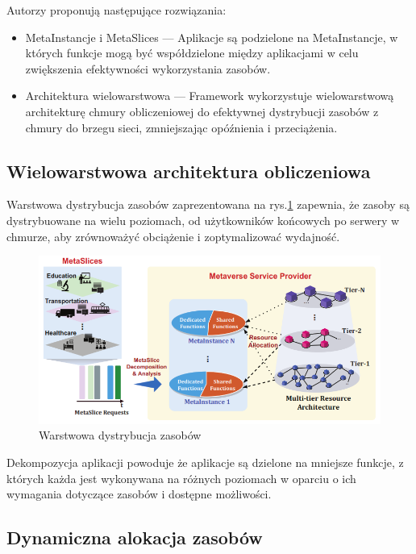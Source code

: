 Autorzy proponują następujące rozwiązania:
\begin{itemize}
    \item MetaInstancje i MetaSlices --- Aplikacje są podzielone na MetaInstancje, w których funkcje mogą być współdzielone między aplikacjami w celu zwiększenia efektywności wykorzystania zasobów.
    \item Architektura wielowarstwowa --- Framework wykorzystuje wielowarstwową architekturę chmury obliczeniowej do efektywnej dystrybucji zasobów z chmury do brzegu sieci, zmniejszając opóźnienia i przeciążenia.
\end{itemize}

\subsection{Wielowarstwowa architektura obliczeniowa}

Warstwowa dystrybucja zasobów zaprezentowana na rys.\ref{metaslicingMultiTierArch} zapewnia, że zasoby są dystrybuowane na wielu poziomach, od użytkowników końcowych po serwery w chmurze, aby zrównoważyć obciążenie i zoptymalizować wydajność.

\begin{figure}[!htbp]
    \centering
    \includegraphics[width=\textwidth]{images/existingArchitectres/dynamicResourcemetaslicingMultiTierArch.png}
    \caption{Warstwowa dystrybucja zasobów}
    \label{metaslicingMultiTierArch}
\end{figure}

Dekompozycja aplikacji powoduje że aplikacje są dzielone na mniejsze funkcje, z których każda jest wykonywana na różnych poziomach w oparciu o ich wymagania dotyczące zasobów i dostępne możliwości.

\subsection{Dynamiczna alokacja zasobów}

